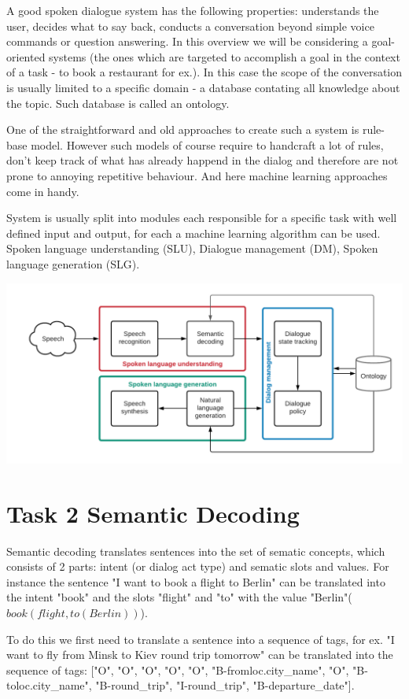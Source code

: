 \documentclass[12pt,titlepage,a4paper]{article}
\begin{document}
A good spoken dialogue system has the following properties: understands the user, decides what to say back, conducts a conversation beyond simple vo\-ice commands or question answering. 
In this overview we will be considering a goal-oriented systems (the ones which are targeted to accomplish a goal in the context of a task - to book a restaurant for ex.). In this case the scope of the conversation is usually limited to a specific domain - a database contating all knowledge about the topic. Such database is called an ontology.
\par
One of the straightforward and old approaches to create such a system is rule-base model. However such models of course require to handcraft a lot of rules, don't keep track of what has already happend in the dialog and therefore are not prone to annoying repetitive behaviour. And here machine learning approaches come in handy. \par

System is usually split into modules each responsible for a specific task with well defined input and output, for each a machine learning algorithm can be used. Spoken language understanding (SLU), Dialogue management (DM), Spoken language generation (SLG). \par
\includegraphics[width=\linewidth]{SDS-main.png}

\pagebreak
\section{Task 2 Semantic Decoding}
Semantic decoding translates sentences into the set of sematic concepts, which consists of 2 parts: intent (or dialog act type) and sematic slots and values. For instance the sentence "I want to book a flight to Berlin" can be translated into the intent "book" and the slots "flight" and "to" with the value "Berlin"($book(flight, to(Berlin))$).

To do this we first need to translate a sentence into a sequence of tags, for ex. "I want to fly from Minsk to Kiev round trip tomorrow" can be translated into the sequence of tags: ["O", "O", "O", "O", "O", "B-fromloc.city\_name", "O", "B-toloc.city\_name", "B-round\_trip", "I-round\_trip", "B-departure\_date"].
\end{document}
